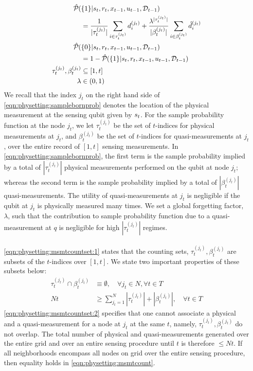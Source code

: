 \begin{align}
\hat{\mathcal{P}}_{} (&\{1\} | s_{ t}, r_{ t}, x_{t-1}, u_{t-1}, \mathcal{D}_{t-1}) \nonumber \\ 
&=  \frac{1}{|\tau^{(j_t)}_t|}\sum_{i \in \tau^{(j_t)}_t} d^{( j_t )}_{i} + \frac{\lambda^{|\tau^{(j_t)}_t|}}{|\beta^{(j_t)}_t|}\sum_{i \in \beta^{(j_t)}_t } \hat{d}^{( j_t )}_{i}  \label{eqn:physetting:samplebornprob} \\ 
\hat{\mathcal{P}}_{} (&\{0\} | s_{ t}, r_{ t}, x_{t-1}, u_{t-1}, \mathcal{D}_{t-1}) \nonumber \\
&= 1 - \hat{\mathcal{P}}_{} (\{1\} | s_{ t}, r_{ t}, x_{t-1}, u_{t-1}, \mathcal{D}_{t-1}) \\
\tau^{(j_t)}_t , \beta^{(j_t)}_t & \subseteq [1, t] \label{eqn:physetting:msmtcountset:1}  \\
\lambda & \in (0,1) \label{eqn:physetting:forgettingfactor} 
\end{align} We recall that the index $j_t$  on the right hand side of \cref{eqn:physetting:samplebornprob} denotes the location of the physical measurement at the sensing qubit given by $s_{ t}$. For the sample probability function at the node $j_t$, we let $\tau^{(j_t)}_t $ be the set of $t$-indices for physical measurements at $j_t$, and $ \beta^{(j_t)}_t $ be the set of $t$-indices for quasi-measurements at $j_t$, over the entire record of $[1, t]$ sensing measurements. In \cref{eqn:physetting:samplebornprob}, the first term is the sample probability  implied by a total of $|\tau^{(j_t)}_t|$ physical measurements performed on the qubit at node $j_t$; whereas the second term is the sample probability  implied by a total of $|\beta^{(j_t)}_t|$ quasi-measurements. The utility of quasi-measurements at $j_t$ is negligible if the qubit at $j_t$ is physically measured many times. We set a global forgetting factor, $\lambda$, such that the contribution to sample probability function due to a quasi-measurement at $q$ is negligible for high $|\tau^{(j_t)}_t|$ regimes. \\
\\
\cref{eqn:physetting:msmtcountset:1} states that the counting sets, $\tau^{(j_t)}_t, \beta^{(j_t)}_t$ are subsets of the $t$-indices over $[1,t]$. We state two important properties of these subsets below:
\begin{align}
\tau^{(j_t)}_t \cap \beta^{(j_t)}_t & \equiv \emptyset , \quad\forall j_t \in N, \forall t \in T \label{eqn:physetting:msmtcountset:2} \\
Nt & \geq \sum_{j_t=1}^{N} |\tau^{(j_t)}_t| + |\beta^{(j_t)}_t| , \quad \forall t \in T \label{eqn:physetting:msmtcount} 
\end{align} \cref{eqn:physetting:msmtcountset:2}  specifies that one cannot associate a physical and a quasi-measurement for a node at $j_t$ at the same $t$, namely,  $\tau^{(j_t)}_t, \beta^{(j_t)}_t$ do not overlap. The total number of physical and quasi-measurements generated over the entire grid and over an entire sensing procedure until $t$ is therefore $\leq Nt$. If all neighborhoods encompass all nodes on grid over the entire sensing procedure, then equality holds in \cref{eqn:physetting:msmtcount}. \\

